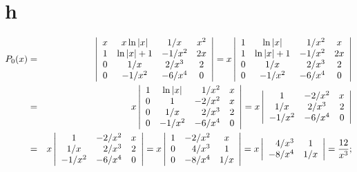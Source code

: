 \documentclass[dvips]{book}
\numberwithin{example}{section}
\numberwithin{equation}{section}
\numberwithin{theorem}{section}
\numberwithin{table}{section}
\numberwithin{figure}{section}
\begin{document}
\part{h}
\begin{eqnarray*}
P_0(x)&=&
\left|\begin{array}{cccc}
x&x\ln|x|&1/x&x^2\\
1&\ln|x|+1&-1/x^2&2x\\
0&1/x&2/x^3&2\\
0&-1/x^2&-6/x^4&0
\end{array}\right|=
x\left|\begin{array}{ccrc}
1&\ln|x|&1/x^2&x\\
1&\ln|x|+1&-1/x^2&2x\\
0&1/x&2/x^3&2\\
0&-1/x^2&-6/x^4&0
\end{array}\right|\\
&=&x\left|\begin{array}{ccrc}
1&\ln|x|&1/x^2&x\\
0&1&-2/x^2&x\\
0&1/x&2/x^3&2\\
0&-1/x^2&-6/x^4&0
\end{array}\right|
=x\left|\begin{array}{ccrc}
1&-2/x^2&x\\
1/x&2/x^3&2\\
-1/x^2&-6/x^4&0
\end{array}\right|\\
&=&x\left|\begin{array}{crc}
1&-2/x^2&x\\
1/x&2/x^3&2\\
-1/x^2&-6/x^4&0
\end{array}\right|
=x\left|\begin{array}{crc}
1&-2/x^2&x\\
0&4/x^3&1\\
0&-8/x^4&1/x
\end{array}\right|
=x\left|\begin{array}{rc}
4/x^3&1\\
-8/x^4&1/x
\end{array}\right|={12\over x^3};
\end{eqnarray*}
\end{document}
